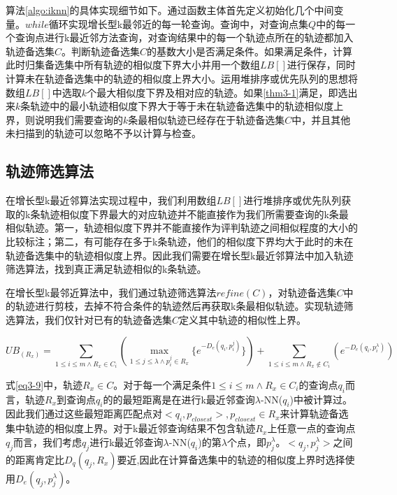 算法\ref{algo:iknn}的具体实现细节如下。通过函数主体首先定义初始化几个中间变量。$while$循环实现增长型k最邻近的每一轮查询。查询中，对查询点集$Q$中的每一个查询点进行k最近邻方法查询，对查询结果中的每一个轨迹点所在的轨迹都加入轨迹备选集$C$。判断轨迹备选集$C$的基数大小是否满足条件。如果满足条件，计算此时归集备选集中所有轨迹的相似度下界大小并用一个数组$LB[]$进行保存，同时计算未在轨迹备选集中的轨迹的相似度上界大小。运用堆排序或优先队列的思想将数组$LB[]$中选取$k$个最大相似度下界及相对应的轨迹。如果\ref{thm3-1}满足，即选出来$k$条轨迹中的最小轨迹相似度下界大于等于未在轨迹备选集中的轨迹相似度上界，则说明我们需要查询的$k$条最相似轨迹已经存在于轨迹备选集$C$中，并且其他未扫描到的轨迹可以忽略不予以计算与检查。
\\

\subsection{轨迹筛选算法}
\label{subsec:refinement}
在增长型k最近邻算法实现过程中，我们利用数组$LB[]$进行堆排序或优先队列获取的k条轨迹相似度下界最大的对应轨迹并不能直接作为我们所需要查询的k条最相似轨迹。第一，轨迹相似度下界并不能直接作为评判轨迹之间相似程度的大小的比较标注；第二，有可能存在多于k条轨迹，他们的相似度下界均大于此时的未在轨迹备选集中的轨迹相似度上界。因此我们需要在增长型k最近邻算法中加入轨迹筛选算法，找到真正满足轨迹相似的k条轨迹。

在增长型k最邻近算法中，我们通过轨迹筛选算法$refine(C)$，对轨迹备选集$C$中的轨迹进行剪枝，去掉不符合条件的轨迹然后再获取k条最相似轨迹。实现轨迹筛选算法，我们仅针对已有的轨迹备选集$C$定义其中轨迹的相似性上界。

\begin{equation}
	\label{eq3-9}
	UB_(R_{x}) = \sum_{1\leq i\leq m \wedge R_{x}\in C_{i}}(\max \limits_{1\leq j\leq \lambda \wedge p_{i}^{j}\in R_{x}}\{e^{-D_{e}(q_{i}, p_{i}^{j})}\}) 
	+ \sum_{1\leq i\leq m \wedge R_{x}\notin C_{i}}(e^{-D_{e}(q_{i}, p_{i}^{\lambda})})
\end{equation}

式\ref{eq3-9}中，轨迹$R_{x} \in C$。对于每一个满足条件${1\leq i\leq m\wedge R_{x}\in  C_{i}}$的查询点$q_{i}$而言，轨迹$R_{x}$到查询点$q_{i}$的的最短距离是在进行k最近邻查询$\lambda$-NN($q_{i}$)中被计算过。因此我们通过这些最短距离匹配点对$<q_{i}, p_{closest}>, p_{closest}\in R_{x}$来计算轨迹备选集中轨迹的相似度上界。对于k最近邻查询结果不包含轨迹$R_{x}$上任意一点的查询点$q_{j}$而言，我们考虑$q_{j}$进行k最近邻查询$\lambda$-NN($q_{i}$)的第$\lambda$个点，即$p_{j}^{\lambda}$。$<q_{j},p_{j}^{\lambda}>$之间的距离肯定比$D_{q}({q_{j},R_{x}})$要近,因此在计算备选集中的轨迹的相似度上界时选择使用$D_{e}(q_{j},p_{j}^{\lambda})$。

